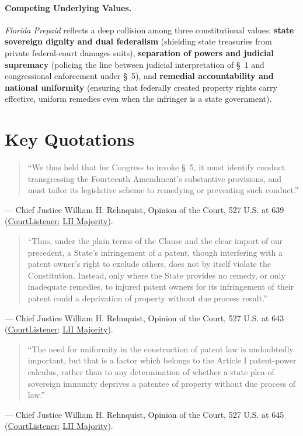 \documentclass[12pt]{article}
\begin{document}
\paragraph{Competing Underlying Values.}
\textit{Florida Prepaid} reflects a deep collision among three constitutional values: \textbf{state sovereign dignity and dual federalism} (shielding state treasuries from private federal-court damages suits), \textbf{separation of powers and judicial supremacy} (policing the line between judicial interpretation of \S~1 and congressional enforcement under \S~5), and \textbf{remedial accountability and national uniformity} (ensuring that federally created property rights carry effective, uniform remedies even when the infringer is a state government).

\section{Key Quotations}

\begin{quote}
``We thus held that for Congress to invoke \S~5, it must identify conduct transgressing the Fourteenth Amendment's substantive provisions, and must tailor its legislative scheme to remedying or preventing such conduct.''
\end{quote}
\noindent --- Chief Justice William H. Rehnquist, Opinion of the Court, 527 U.S. at 639 (\href{https://www.courtlistener.com/opinion/118316/florida-prepaid-postsecondary-education-expense-board-v-college-savings/}{CourtListener}; \href{https://www.law.cornell.edu/supct/html/98-531.ZO.html}{LII Majority}).

\begin{quote}
``Thus, under the plain terms of the Clause and the clear import of our precedent, a State's infringement of a patent, though interfering with a patent owner's right to exclude others, does not by itself violate the Constitution. Instead, only where the State provides no remedy, or only inadequate remedies, to injured patent owners for its infringement of their patent could a deprivation of property without due process result.''
\end{quote}
\noindent --- Chief Justice William H. Rehnquist, Opinion of the Court, 527 U.S. at 643 (\href{https://www.courtlistener.com/opinion/118316/florida-prepaid-postsecondary-education-expense-board-v-college-savings/}{CourtListener}; \href{https://www.law.cornell.edu/supct/html/98-531.ZO.html}{LII Majority}).

\begin{quote}
``The need for uniformity in the construction of patent law is undoubtedly important, but that is a factor which belongs to the Article I patent-power calculus, rather than to any determination of whether a state plea of sovereign immunity deprives a patentee of property without due process of law.''
\end{quote}
\noindent --- Chief Justice William H. Rehnquist, Opinion of the Court, 527 U.S. at 645 (\href{https://www.courtlistener.com/opinion/118316/florida-prepaid-postsecondary-education-expense-board-v-college-savings/}{CourtListener}; \href{https://www.law.cornell.edu/supct/html/98-531.ZO.html}{LII Majority}).
\end{document}
